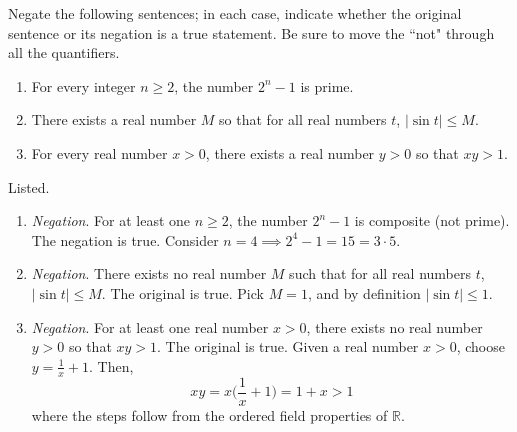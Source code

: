   \begin{exercise} 
    Negate the following sentences; in each case, indicate whether the original sentence or its negation is a true statement. Be sure to move the ``not" through all the quantifiers.
    \begin{enumerate}
      \item For every integer $n \geq 2$, the number $2^n - 1$ is prime.
      \item There exists a real number $M$ so that for all real numbers $t$, $|\sin t| \leq M$.
      \item For every real number $x > 0$, there exists a real number $y > 0$ so that $xy > 1$.
    \end{enumerate}
  \end{exercise}
  \begin{solution}
    Listed. 
    \begin{enumerate}
      \item \textit{Negation}. For at least one $n \geq 2$, the number $2^n - 1$ is composite (not prime). The negation is true. Consider $n = 4 \implies 2^4 - 1 = 15 = 3 \cdot 5$. 

      \item \textit{Negation}. There exists no real number $M$ such that for all real numbers $t$, $|\sin{t}| \leq M$. The original is true. Pick $M=1$, and by definition $|\sin{t}| \leq 1$. 

      \item \textit{Negation}. For at least one real number $x > 0$, there exists no real number $y > 0$ so that $xy > 1$. The original is true. Given a real number $x > 0$, choose $y = \frac{1}{x} + 1$. Then, 
      \begin{equation}
        xy = x \bigg( \frac{1}{x} + 1 \bigg) = 1 + x > 1
      \end{equation} 
      where the steps follow from the ordered field properties of $\mathbb{R}$. 
    \end{enumerate}
  \end{solution} 


